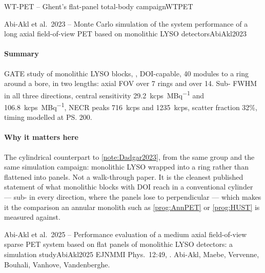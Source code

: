 \begin{programnote}{WT-PET -- Ghent's flat-panel total-body campaign}{WTPET}
\begin{papernote}{Abi-Akl et al.\ 2023 -- Monte Carlo simulation of the system performance of a long axial field-of-view PET based on monolithic LYSO detectors}{AbiAkl2023}
\paragraph{Summary}
GATE study of monolithic LYSO blocks, ,
DOI-capable, 40 modules to a ring around a  bore, in two lengths:
 axial FOV over 7 rings and  over 14. Sub- FWHM in
all three directions, central sensitivity \qty{29.2}{\kilo cps\per\mega\becquerel}
and \qty{106.8}{\kilo cps\per\mega\becquerel}, NECR peaks \qty{716}{\kilo cps}
and \qty{1235}{\kilo cps}, scatter fraction 32\%, timing modelled at \ps{200}.

\paragraph{Why it matters here}
The cylindrical counterpart to \ref{note:Dadgar2023}, from the same group
and the same simulation campaign: monolithic LYSO wrapped into a ring rather
than flattened into panels. Not a walk-through paper. It is the cleanest
published statement of what monolithic blocks with DOI reach in a conventional
cylinder --- sub- in every direction, where the panels lose to
 perpendicular --- which makes it the comparison an annular
monolith such as \ref{prog:AnnPET} or \ref{prog:HUST} is measured against.

\end{papernote}

\begin{papernote}{Abi-Akl et al.\ 2025 -- Performance evaluation of a medium axial field-of-view sparse PET system based on flat panels of monolithic LYSO detectors: a simulation study}{AbiAkl2025}
EJNMMI Phys.\ 12:49, . Abi-Akl, Maebe,
Vervenne, Bouhali, Vanhove, Vandenberghe.


\end{papernote}
\end{programnote}
